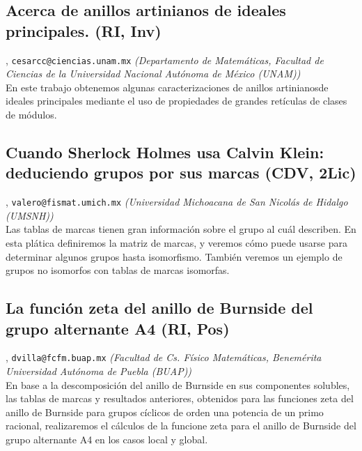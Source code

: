 \subsection{\sffamily Acerca de anillos artinianos de ideales principales. {\footnotesize (RI, Inv)}} \label{reg-285} 
, {\tt cesarcc@ciencias.unam.mx}  {\slshape (Departamento de Matem\'aticas, Facultad de Ciencias de la Universidad Nacional Aut\'onoma de M\'exico (UNAM))}\\
          \noindent En este trabajo obtenemos algunas caracterizaciones de anillos artinianosde ideales principales mediante el uso de propiedades de grandes ret\'iculas de clases de m\'odulos.
\subsection{\sffamily Cuando Sherlock Holmes usa Calvin Klein: deduciendo grupos por sus marcas {\footnotesize (CDV, 2Lic)}} \label{reg-346} 
, {\tt valero@fismat.umich.mx}  {\slshape (Universidad Michoacana de San Nicol\'as de Hidalgo (UMSNH))}\\
          \noindent Las tablas de marcas tienen gran informaci\'on sobre el grupo al cu\'al describen. En esta pl\'atica definiremos la matriz de marcas, y veremos c\'omo puede usarse para determinar algunos grupos hasta isomorfismo. Tambi\'en veremos un ejemplo de grupos no isomorfos con tablas de marcas isomorfas.
\subsection{\sffamily La funci\'on zeta del anillo de Burnside del grupo alternante A4 {\footnotesize (RI, Pos)}} \label{reg-707} 
, {\tt dvilla@fcfm.buap.mx}  {\slshape (Facultad de Cs. F\'isico Matem\'aticas, Benem\'erita Universidad Aut\'onoma de Puebla (BUAP))}\\
          \noindent  En base a la descomposici\'on del anillo de Burnside en sus componentes solubles, las tablas de marcas y resultados anteriores, obtenidos para las funciones zeta del anillo de Burnside para grupos c\'iclicos de orden una potencia de un primo racional, realizaremos el c\'alculos de la funcione zeta para el anillo de Burnside del grupo alternante A4 en los casos local y global.
